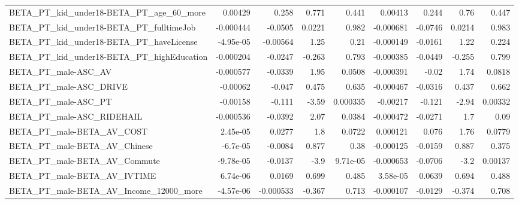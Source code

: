 \begin{tabular}{lrrrrrrrr}
BETA\_PT\_kid\_under18-BETA\_PT\_age\_60\_more            &     0.00429 &        0.258 &    0.771 &    0.441 &    0.00413 &       0.244 &         0.76 &         0.447 \\
BETA\_PT\_kid\_under18-BETA\_PT\_fulltimeJob            &   -0.000444 &      -0.0505 &   0.0221 &    0.982 &  -0.000681 &     -0.0746 &       0.0214 &         0.983 \\
BETA\_PT\_kid\_under18-BETA\_PT\_haveLicense            &   -4.95e-05 &     -0.00564 &     1.25 &     0.21 &  -0.000149 &     -0.0161 &         1.22 &         0.224 \\
BETA\_PT\_kid\_under18-BETA\_PT\_highEducation          &   -0.000204 &      -0.0247 &   -0.263 &    0.793 &  -0.000385 &     -0.0449 &       -0.255 &         0.799 \\
BETA\_PT\_male-ASC\_AV                                &   -0.000577 &      -0.0339 &     1.95 &   0.0508 &  -0.000391 &       -0.02 &         1.74 &        0.0818 \\
BETA\_PT\_male-ASC\_DRIVE                             &    -0.00062 &       -0.047 &    0.475 &    0.635 &  -0.000467 &     -0.0316 &        0.437 &         0.662 \\
BETA\_PT\_male-ASC\_PT                                &    -0.00158 &       -0.111 &    -3.59 & 0.000335 &   -0.00217 &      -0.121 &        -2.94 &       0.00332 \\
BETA\_PT\_male-ASC\_RIDEHAIL                          &   -0.000536 &      -0.0392 &     2.07 &   0.0384 &  -0.000472 &     -0.0271 &          1.7 &          0.09 \\
BETA\_PT\_male-BETA\_AV\_COST                          &    2.45e-05 &       0.0277 &      1.8 &   0.0722 &   0.000121 &       0.076 &         1.76 &        0.0779 \\
BETA\_PT\_male-BETA\_AV\_Chinese                       &    -6.7e-05 &      -0.0084 &    0.877 &     0.38 &  -0.000125 &     -0.0159 &        0.887 &         0.375 \\
BETA\_PT\_male-BETA\_AV\_Commute                       &   -9.78e-05 &      -0.0137 &     -3.9 & 9.71e-05 &  -0.000653 &     -0.0706 &         -3.2 &       0.00137 \\
BETA\_PT\_male-BETA\_AV\_IVTIME                        &    6.74e-06 &       0.0169 &    0.699 &    0.485 &   3.58e-05 &      0.0639 &        0.694 &         0.488 \\
BETA\_PT\_male-BETA\_AV\_Income\_12000\_more             &   -4.57e-06 &    -0.000533 &   -0.367 &    0.713 &  -0.000107 &     -0.0129 &       -0.374 &         0.708 \\

\end{tabular}
